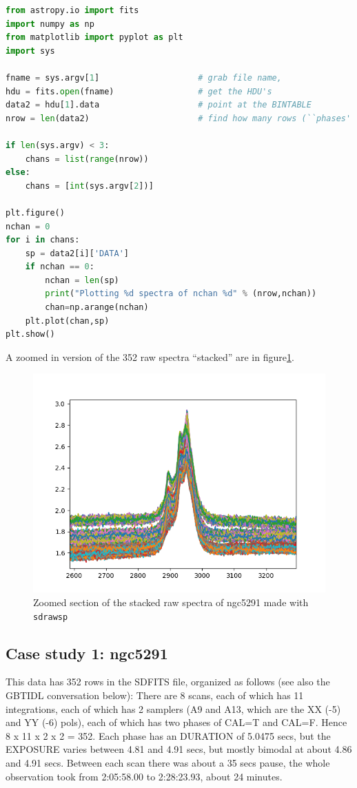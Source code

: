 \documentclass[12pt,a4paper]{article}
\begin{document}
\begin{lstlisting}[language=python]
from astropy.io import fits
import numpy as np
from matplotlib import pyplot as plt
import sys

fname = sys.argv[1]                    # grab file name, 
hdu = fits.open(fname)                 # get the HDU's
data2 = hdu[1].data                    # point at the BINTABLE
nrow = len(data2)                      # find how many rows (``phases'')

if len(sys.argv) < 3:
    chans = list(range(nrow))
else:
    chans = [int(sys.argv[2])]

plt.figure()
nchan = 0
for i in chans:
    sp = data2[i]['DATA']
    if nchan == 0:
        nchan = len(sp)
        print("Plotting %d spectra of nchan %d" % (nrow,nchan))
        chan=np.arange(nchan)
    plt.plot(chan,sp)
plt.show() 
\end{lstlisting}

A zoomed in version of the 352 raw spectra ``stacked'' are in figure\ref{fig4}.

\begin{figure}[h]
\centering
  \includegraphics[width=\textwidth]{sdrawsp1.png}
  \caption{\label{fig4} Zoomed section of the stacked raw spectra of ngc5291 made with {\tt sdrawsp}}
\end{figure}


\subsection{Case study 1: ngc5291}

This data has 352 rows in the SDFITS file, organized as follows (see also the GBTIDL
conversation below):  There are 8 scans, each of which has 11 integrations, each of
which has 2 samplers (A9 and A13, which are the XX (-5) and YY (-6) pols), each of which has
two phases of CAL=T and CAL=F. Hence 8 x 11 x 2 x 2 = 352.   Each phase has an DURATION
of 5.0475 secs, but the EXPOSURE varies between 4.81 and 4.91 secs, but mostly bimodal
at about 4.86 and 4.91 secs.  Between each scan there was about a 35 secs pause, the
whole observation took from 2:05:58.00 to 2:28:23.93, about 24 minutes.
\end{document}
